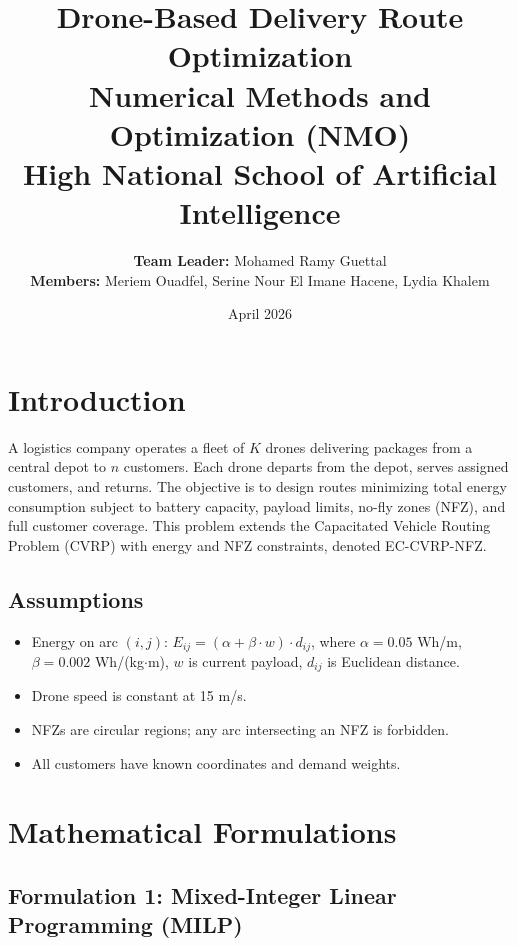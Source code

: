\documentclass[12pt,a4paper]{article}
\title{\textbf{Drone-Based Delivery Route Optimization}\\[6pt]
\large Numerical Methods and Optimization (NMO)\\
High National School of Artificial Intelligence}
\author{
\textbf{Team Leader:} Mohamed Ramy Guettal\\
\textbf{Members:} Meriem Ouadfel, Serine Nour El Imane Hacene, Lydia Khalem
}
\date{April 2026}
\begin{document}
\maketitle
\tableofcontents
\newpage

\section{Introduction}
A logistics company operates a fleet of $K$ drones delivering packages from a central depot to $n$ customers. Each drone departs from the depot, serves assigned customers, and returns. The objective is to design routes minimizing total energy consumption subject to battery capacity, payload limits, no-fly zones (NFZ), and full customer coverage. This problem extends the Capacitated Vehicle Routing Problem (CVRP) with energy and NFZ constraints, denoted EC-CVRP-NFZ.

\subsection{Assumptions}
\begin{itemize}[nosep]
  \item Energy on arc $(i,j)$: $E_{ij}=(\alpha + \beta \cdot w)\cdot d_{ij}$, where $\alpha=0.05$ Wh/m, $\beta=0.002$ Wh/(kg$\cdot$m), $w$ is current payload, $d_{ij}$ is Euclidean distance.
  \item Drone speed is constant at 15 m/s.
  \item NFZs are circular regions; any arc intersecting an NFZ is forbidden.
  \item All customers have known coordinates and demand weights.
\end{itemize}

\section{Mathematical Formulations}

\subsection{Formulation 1: Mixed-Integer Linear Programming (MILP)}
\end{document}
